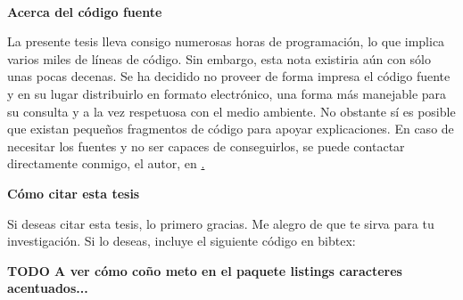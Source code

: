 \cleardoublepage
\begin{fullwidth}
~\vfill
\thispagestyle{empty}
\setlength{\parindent}{0pt}
\setlength{\parskip}{\baselineskip}
\par{
	\textbf{Acerca del código fuente}
	
	La presente tesis lleva consigo numerosas horas de programación, lo que implica varios miles de líneas de código. Sin embargo, esta nota existiria aún con sólo unas pocas decenas. Se ha decidido no proveer de forma impresa el código fuente y en su lugar distribuirlo en formato electrónico, una forma más manejable para su consulta y a la vez respetuosa con el medio ambiente. No obstante sí es posible que existan pequeños fragmentos de código para apoyar explicaciones. En caso de necesitar los fuentes y no ser capaces de conseguirlos, se puede contactar directamente conmigo, el autor, en \href{mailto:alberto.diaz@upm.es}.
	}

\par{
	\textbf{Cómo citar esta tesis}
	
	Si deseas citar esta tesis, lo primero gracias. Me alegro de que te sirva para tu investigación. Si lo deseas, incluye el siguiente código en bibtex:
	
	\textbf{TODO A ver cómo coño meto en el paquete listings caracteres acentuados...}
	}


\end{fullwidth}


